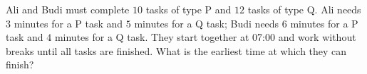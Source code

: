 Ali and Budi must complete $10$ tasks of type P and $12$ tasks of type Q. Ali needs $3$ minutes for a P task and $5$ minutes for a Q task; Budi needs $6$ minutes for a P task and $4$ minutes for a Q task. They start together at 07:00 and work without breaks until all tasks are finished. What is the earliest time at which they can finish?
